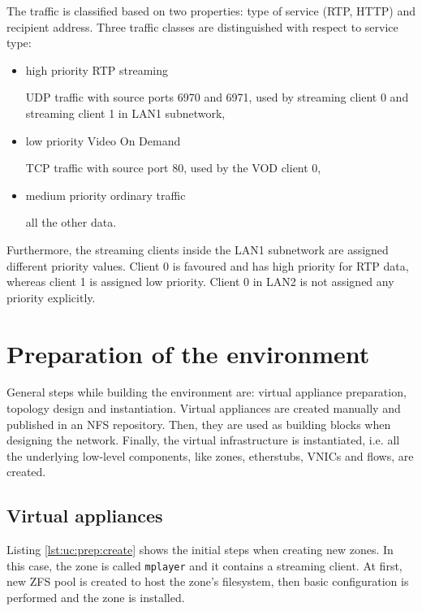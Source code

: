 \documentclass[11pt]{book}
\begin{document}
        The traffic is classified based on two properties: type of service (RTP, HTTP) and recipient address. Three
        traffic classes are distinguished with respect to service type:

        \begin{itemize}

          \item high priority RTP streaming

                UDP traffic with source ports 6970 and 6971, used by streaming client 0
                and streaming client 1 in LAN1 subnetwork,

          \item low priority Video On Demand
          
                TCP traffic with source port 80, used by the VOD client 0,

          \item medium priority ordinary traffic
          
                all the other data.

        \end{itemize}

        Furthermore, the streaming clients inside the LAN1 subnetwork are assigned different priority values. Client 0 is
        favoured and has high priority for RTP data, whereas client 1 is assigned low priority. Client 0 in LAN2
        is not assigned any priority explicitly.


    \section{Preparation of the environment}
    \label{sec:uc:prep}

      General steps while building the environment are: virtual appliance preparation, topology design and
      instantiation. Virtual appliances are created manually and published in an NFS repository. Then, they are used as
      building blocks when designing the network. Finally, the virtual infrastructure is instantiated, i.e. all the
      underlying low-level components, like zones, etherstubs, VNICs and flows, are created.


      \subsection{Virtual appliances}
      \label{ssub:case:prep:va}

        Listing \ref{lst:uc:prep:create} shows the initial steps when creating new zones. In this case, the zone is
        called \texttt{mplayer} and it contains a streaming client. At first, new ZFS pool is created to host the zone's
        filesystem, then basic configuration is performed and the zone is installed. \\
\end{document}
